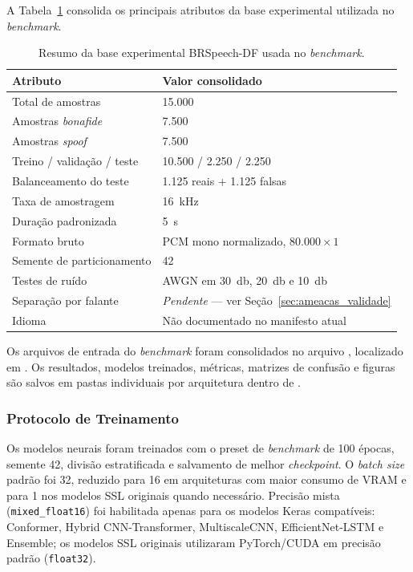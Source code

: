 \documentclass[12pt,a4paper]{article}
\begin{document}
A Tabela~\ref{tab:dataset_brspeechdf} consolida os principais atributos da base
experimental utilizada no \textit{benchmark}.

\begin{table}[H]
\centering
\caption{Resumo da base experimental BRSpeech-DF usada no \textit{benchmark}.}
\label{tab:dataset_brspeechdf}
\begin{tabular}{ll}
\toprule
\textbf{Atributo} & \textbf{Valor consolidado} \\
\midrule
Total de amostras & 15.000 \\
Amostras \textit{bonafide} & 7.500 \\
Amostras \textit{spoof} & 7.500 \\
Treino / validação / teste & 10.500 / 2.250 / 2.250 \\
Balanceamento do teste & 1.125 reais + 1.125 falsas \\
Taxa de amostragem & \SI{16}{\kilo\hertz} \\
Duração padronizada & \SI{5}{\second} \\
Formato bruto & PCM mono normalizado, $80{.}000\times1$ \\
Semente de particionamento & 42 \\
Testes de ruído & AWGN em \SI{30}{\decibel}, \SI{20}{\decibel} e \SI{10}{\decibel} \\
Separação por falante & \emph{Pendente} --- ver Seção~\ref{sec:ameacas_validade} \\
Idioma & Não documentado no manifesto atual \\
\bottomrule
\end{tabular}
\end{table}

Os arquivos de entrada do \textit{benchmark} foram consolidados no arquivo
, localizado em
. Os resultados, modelos treinados, métricas, matrizes de
confusão e figuras são salvos em pastas individuais por arquitetura dentro de
.

\subsubsection{Protocolo de Treinamento}
\label{sec:protocolo_treinamento}

Os modelos neurais foram treinados com o preset de \textit{benchmark} de
100 épocas, semente 42, divisão estratificada e salvamento de melhor
\textit{checkpoint}. O \textit{batch size} padrão foi 32, reduzido para 16 em
arquiteturas com maior consumo de VRAM e para 1 nos modelos SSL originais
quando necessário. Precisão mista (\texttt{mixed\_float16}) foi habilitada
apenas para os modelos Keras compatíveis: Conformer, Hybrid CNN-Transformer,
MultiscaleCNN, EfficientNet-LSTM e Ensemble; os modelos SSL originais
utilizaram PyTorch/CUDA em precisão padrão (\texttt{float32}).
\end{document}
